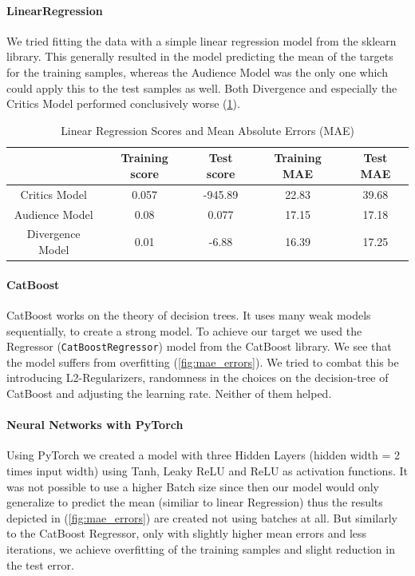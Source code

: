 \documentclass{article}
\begin{document}
    \paragraph{LinearRegression}
    We tried fitting the data with a simple linear regression model from the sklearn library. This generally resulted in the model predicting the mean of the targets for the training samples, whereas the Audience Model was the only one which could apply this to the test samples as well. Both Divergence and especially the Critics Model performed conclusively worse (\ref{tab:lin_regression}).
    \begin{table}[h]
        \centering
        \begin{tabular}{c||c|c|c|c}
             & Training score & Test score & Training MAE & Test MAE \\
            \hline
            Critics Model       & 0.057 & -945.89   & 22.83     & 39.68 \\
            \hline
            Audience Model      & 0.08  & 0.077     & 17.15     & 17.18 \\
            \hline
            Divergence Model    & 0.01  & -6.88     & 16.39     & 17.25
        \end{tabular}
        \caption{Linear Regression Scores and Mean Absolute Errors (MAE)}
        \label{tab:lin_regression}
    \end{table}

    \paragraph{CatBoost}
    CatBoost works on the theory of decision trees. It uses many weak models sequentially, to create a strong model. To achieve our target we used the Regressor (\texttt{CatBoostRegressor}) model from the CatBoost library.
    We see that the model suffers from overfitting (\ref{fig:mae_errors}). We tried to combat this be introducing L2-Regularizers, randomness in the choices on the decision-tree of CatBoost and adjusting the learning rate. Neither of them helped. 
    
    \paragraph{Neural Networks with PyTorch}
    Using PyTorch we created a model with three Hidden Layers (hidden width = 2 times input width) using Tanh, Leaky ReLU and ReLU as activation functions. It was not possible to use a higher Batch size since then our model would only generalize to predict the mean (similiar to linear Regression) thus the results depicted in (\ref{fig:mae_errors}) are created not using batches at all. But similarly to the CatBoost Regressor, only with slightly higher mean errors and less iterations, we achieve overfitting of the training samples and slight reduction in the test error. 
    
\end{document}
